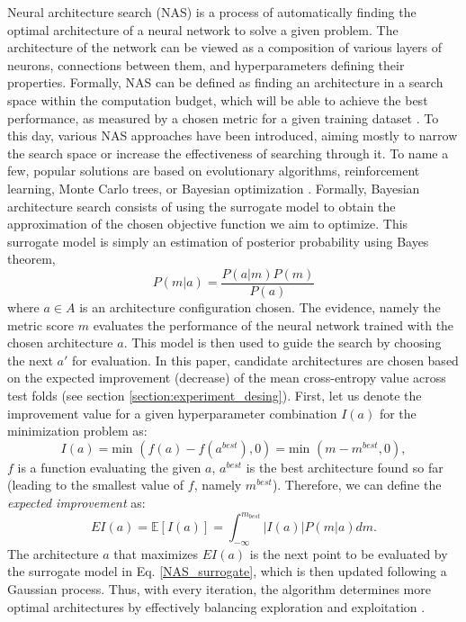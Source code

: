 \documentclass[a4paper,fleqn]{cas-sc}
\begin{document}
Neural architecture search (NAS) is a process of automatically finding the optimal architecture of a neural network to solve a given problem. The architecture of the network can be viewed as a composition of various layers of neurons, connections between them, and hyperparameters defining their properties. 
Formally, NAS can be defined as finding an architecture in a search space within the computation budget, which will be able to achieve the best performance, as measured by a chosen metric for a given training dataset \cite{white2023neural}. To this day, various NAS approaches have been introduced, aiming mostly to narrow the search space or increase the effectiveness of searching through it. To name a few, popular solutions are based on evolutionary algorithms, reinforcement learning, Monte Carlo trees, or Bayesian optimization \cite{white2023neural}. 
Formally, Bayesian architecture search consists of using the surrogate model to obtain the approximation of the chosen objective function we aim to optimize.
This surrogate model is simply an estimation of posterior probability using Bayes theorem,
\begin{equation} \label{NAS_surrogate}
    P(m|a) =  \frac{P(a|m)P(m)}{P(a)}
\end{equation}
where $a \in A$ is an architecture configuration chosen. The evidence, namely the metric score $m$ evaluates the performance of the neural network trained with the chosen architecture $a$. 
This model is then used to guide the search by choosing the next $a'$ for evaluation. In this paper, candidate architectures are chosen based on the
expected improvement (decrease) of the mean cross-entropy value across test folds (see section \ref{section:experiment_desing}). First, let us denote the improvement value for a given hyperparameter combination $I(a)$ for the minimization problem as:
\begin{equation}
    I(a) = \text{min }(f(a) - f(a^{best}),0) = \text{min }(m - m^{best},0),
\end{equation}
$f$ is a function evaluating the given $a$, $a^{best}$ is the best architecture found so far (leading to the smallest value of $f$, namely $m^{best}$).
Therefore, we can define the \textit{expected improvement} as:
\begin{equation}
    EI(a) = \mathbb{E}[I(a)] = \int_{-\infty}^{m_{best}}|I(a)|P(m|a)dm.
\end{equation}
The architecture $a$ that maximizes $EI(a)$ is the next point to be evaluated by the surrogate model in Eq. \ref{NAS_surrogate}, which is then updated following a Gaussian process. Thus, with every iteration, the algorithm determines more optimal architectures by effectively balancing exploration and exploitation \cite{elsken2019neural,white2023neural}. 
\end{document}
